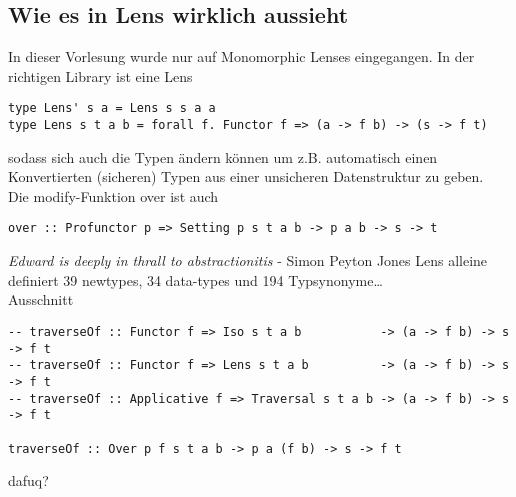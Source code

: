 \documentclass{beamer}
\begin{document}
\subsection{Wie es in Lens wirklich aussieht}
\begin{frame}[fragile]
In dieser Vorlesung wurde nur auf Monomorphic Lenses eingegangen. In der
richtigen Library ist eine Lens

\begin{verbatim}
type Lens' s a = Lens s s a a
type Lens s t a b = forall f. Functor f => (a -> f b) -> (s -> f t)
\end{verbatim}
\pause
sodass sich auch die Typen ändern können um z.B. automatisch einen
Konvertierten (sicheren) Typen aus einer unsicheren Datenstruktur zu
geben.\\
\pause
Die modify-Funktion over ist auch

\begin{verbatim}
over :: Profunctor p => Setting p s t a b -> p a b -> s -> t
\end{verbatim}
\end{frame}

\begin{frame}[fragile]
\emph{Edward is deeply in thrall to abstractionitis} - Simon Peyton
Jones
\pause
Lens alleine definiert 39 newtypes, 34 data-types und 194
Typsynonyme\ldots{}\\

\pause
Ausschnitt

\begin{verbatim}
-- traverseOf :: Functor f => Iso s t a b           -> (a -> f b) -> s -> f t
-- traverseOf :: Functor f => Lens s t a b          -> (a -> f b) -> s -> f t
-- traverseOf :: Applicative f => Traversal s t a b -> (a -> f b) -> s -> f t

traverseOf :: Over p f s t a b -> p a (f b) -> s -> f t
\end{verbatim}

\pause
dafuq?
\end{frame}
\end{document}

